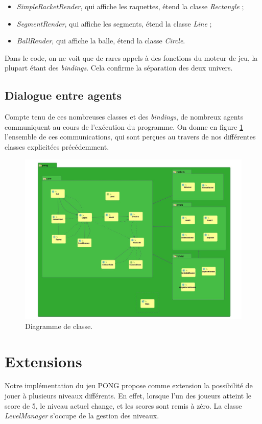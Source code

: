 \documentclass[a4paper,10pt]{article}
\theoremstyle{definition}
\begin{document}
    \begin{itemize}
      \item \emph{SimpleRacketRender}, qui affiche les raquettes, étend la classe \emph{Rectangle} ;
      \item \emph{SegmentRender}, qui affiche les segments, étend la classe \emph{Line} ;
      \item \emph{BallRender}, qui affiche la balle, étend la classe \emph{Circle}.
    \end{itemize}
    Dans le code, on ne voit que de rares appels à des fonctions du moteur de jeu, la plupart étant des \emph{bindings}. Cela confirme la séparation des deux univers.
    
    \subsection{Dialogue entre agents}
    
    Compte tenu de ces nombreuses classes et des \emph{bindings}, de nombreux agents communiquent au cours de l'exécution du programme. On donne en figure \ref{fig:diag} l'ensemble de ces communications, qui sont perçues au travers de nos différentes classes explicitées précédemment.
    	\begin{figure}[!h]
  	  \begin{center}
    	    \includegraphics[width=\textwidth]{Class_diagram.jpg}
    	    \caption{Diagramme de classe.}
    	    \label{fig:diag}
  	  \end{center}
	\end{figure}	

\section{Extensions}
	Notre implémentation du jeu PONG propose comme extension la possibilité de jouer à plusieurs niveaux différents. En effet, lorsque l'un des joueurs atteint le score de 5, le niveau actuel change, et les scores sont remis à zéro. La classe \emph{LevelManager} s'occupe de la gestion des niveaux.
	
\end{document}
